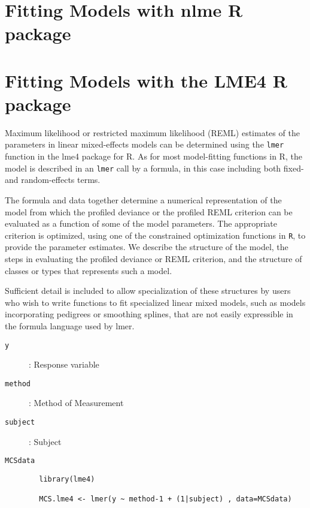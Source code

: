 	
	\section{Fitting Models with nlme R package}
	
	\section{Fitting Models with the LME4 R package}
	Maximum likelihood or restricted maximum likelihood (REML) estimates of the parameters in linear mixed-effects models can be determined using the \texttt{lmer} function in the lme4 package for R. As for most model-fitting functions in R, the model is described in an \texttt{lmer} call by a formula, in this case including both fixed- and random-effects terms. 
	
	The formula and data together determine a numerical representation of the model from which the profiled deviance or the profiled REML criterion can be evaluated as a function of some of the model parameters. The appropriate criterion is optimized, using one of the constrained optimization functions in \texttt{R}, to provide the parameter estimates. We describe the structure of the model, the steps in evaluating the profiled deviance or REML criterion, and the structure of classes or types that represents such a model. 
	
	Sufficient detail is included to allow specialization of these structures by users who wish to write functions to fit specialized linear mixed models, such as models incorporating pedigrees or smoothing splines, that are not easily expressible in the formula language used by lmer.
	
	
	\begin{description}
		\item[\texttt{y}] : Response variable
		\item[\texttt{method}] : Method of Measurement
		\item[\texttt{subject}] : Subject
		\item[\texttt{MCSdata}] 
	\end{description}
	\begin{framed}
		\begin{verbatim}
		library(lme4)
		
		MCS.lme4 <- lmer(y ~ method-1 + (1|subject) , data=MCSdata)
		\end{verbatim}
	\end{framed}
	\newpage
	
